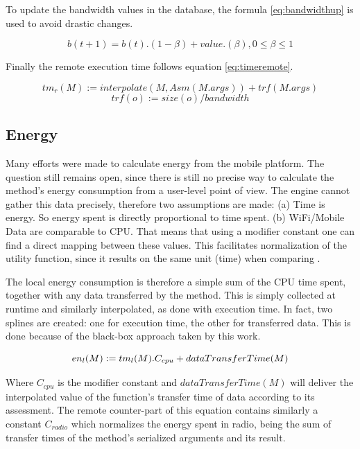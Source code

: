 \documentclass[10pt, conference, letterpaper]{IEEEtran}
\begin{document}
  To update the bandwidth values in the database, the formula \ref{eq:bandwidthup} is used to avoid drastic changes.

  \begin{equation} \label{eq:bandwidthup}
    b(t+1) = b(t) . (1-\beta) + value . (\beta), 0 \leq \beta \leq 1
  \end{equation}

  Finally the remote execution time follows equation \ref{eq:timeremote}.

  \begin{equation} \label{eq:timeremote}
    tm_{r}(M) := interpolate(M, Asm(M.args)) + trf(M.args)
  \end{equation}
  \begin{equation}
    trf(o) := size(o) / bandwidth
  \end{equation}

  \subsection{Energy} \label{sec:energy}

  Many efforts were made to calculate energy from the mobile platform. The question still remains open, since there is still no precise way to calculate the method's energy consumption from a user-level point of view. The engine cannot gather this data precisely, therefore two assumptions are made: (a) Time is energy. So energy spent is directly proportional to time spent. (b) WiFi/Mobile Data are comparable to CPU. That means that using a modifier constant one can find a direct mapping between these values. This facilitates normalization of the utility function, since it results on the same unit (time) when comparing \cite{6606420}.

  The local energy consumption is therefore a simple sum of the CPU time spent, together with any data transferred by the method. This is simply collected at runtime and similarly interpolated, as done with execution time. In fact, two splines are created: one for execution time, the other for transferred data. This is done because of the black-box approach taken by this work. 

  \begin{equation} \label{eq:energylocal}
    en_{l}(M) := \\ tm_{l}(M) . C_{cpu} + dataTransferTime(M)
  \end{equation}

  Where $C_{cpu}$ is the modifier constant and $dataTransferTime(M)$ will deliver the interpolated value of the function's transfer time of data according to its assessment. The remote counter-part of this equation contains similarly a constant $C_{radio}$ which normalizes the energy spent in radio, being the sum of transfer times of the method's serialized arguments and its result.
\end{document}
